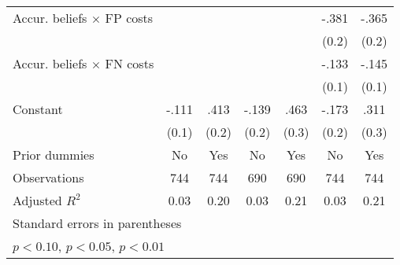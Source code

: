 \begin{table}[htbp]
\begin{tabular}{l*{6}{c}}
Accur. beliefs $\times$ FP costs&                  &                  &                  &                  &    -.381\sym{*}  &    -.365         \\
                &                  &                  &                  &                  &    (0.2)         &    (0.2)         \\
Accur. beliefs $\times$ FN costs&                  &                  &                  &                  &    -.133         &    -.145         \\
                &                  &                  &                  &                  &    (0.1)         &    (0.1)         \\
Constant        &    -.111         &     .413\sym{**} &    -.139         &     .463\sym{*}  &    -.173         &     .311         \\
                &    (0.1)         &    (0.2)         &    (0.2)         &    (0.3)         &    (0.2)         &    (0.3)         \\
Prior dummies   &       No         &      Yes         &       No         &      Yes         &       No         &      Yes         \\
\hline
Observations    &      744         &      744         &      690         &      690         &      744         &      744         \\
Adjusted \(R^{2}\)&     0.03         &     0.20         &     0.03         &     0.21         &     0.03         &     0.21         \\
\hline\hline
\multicolumn{7}{l}{\footnotesize Standard errors in parentheses}\\
\multicolumn{7}{l}{\footnotesize \sym{*} \(p<0.10\), \sym{**} \(p<0.05\), \sym{***} \(p<0.01\)}\\
\end{tabular}
\end{table}
